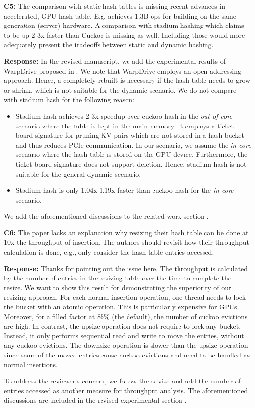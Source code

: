 \begin{shaded}
	\noindent\textbf{C5:} The comparison with static hash tables is missing recent advances in accelerated, GPU hash table. E.g. \cite{junger2018warpdrive} achieves 1.3B ops for building on the same generation (server) hardware. A comparison with stadium hashing \cite{khorasani2015stadium} which claims to be up 2-3x faster than Cuckoo is missing as well. Including those would more adequately present the tradeoffs between static and dynamic hashing.
\end{shaded}
%
\noindent\textbf{Response:} 
In the revised manuscript, we add the experimental results of WarpDrive proposed in \cite{junger2018warpdrive}. 
We note that WarpDrive employs an open addressing approach. Hence, a completely rebuilt is necessary if the hash table needs to grow or shrink, which is not suitable for the dynamic scenario. 
We do not compare with stadium hash \cite{khorasani2015stadium} for the following reason:
\begin{itemize}
	\item Stadium hash achieves 2-3x speedup over cuckoo hash in the \emph{out-of-core} scenario where the table is kept in the main memory. It employs a ticket-board signature for pruning KV pairs which are not stored in a hash bucket and thus reduces PCIe communication. In our scenario, we assume the \emph{in-core} scenario where the hash table is stored on the GPU device. Furthermore, the ticket-board signature does not support deletion. Hence, stadium hash is not suitable for the general dynamic scenario. 
	\item Stadium hash is only 1.04x-1.19x faster than cuckoo hash for the \emph{in-core} scenario. 
\end{itemize}
We add the aforementioned discussions to the related work section .



\begin{shaded}
	\noindent\textbf{C6:} The paper lacks an explanation why resizing their hash table can be done at 10x the throughput of insertion. The authors should revisit how their throughput calculation is done, e.g., only consider the hash table entries accessed.
\end{shaded}
%
\noindent\textbf{Response:}
Thanks for pointing out the issue here. The throughput is calculated by the number of entries in the resizing table over the time to complete the resize. 
We want to show this result for demonstrating the superiority of our resizing approach. 
For each normal insertion operation, one thread needs to lock the bucket with an atomic operation. This is particularly expensive for GPUs. Moreover, for a filled factor at 85\% (the default), the number of cuckoo evictions are high. In contrast, the upsize operation does not require to lock any bucket. Instead, it only performs sequential read and write to move the entries, without any cuckoo evictions. The downsize operation is slower than the upsize operation since some of the moved entries cause cuckoo evictions and need to be handled as normal insertions. 

To address the reviewer's concern, we follow the advise and add the number of entries accessed as another measure for throughput analysis. 
The aforementioned discussions are included in the revised experimental section .
